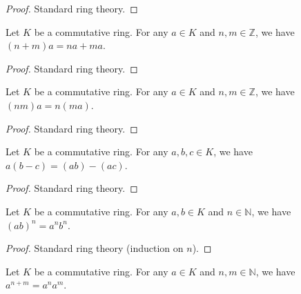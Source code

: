 \begin{proof}
\leanok
Standard ring theory.
\end{proof}

\begin{lemma}
\label{lem.commring.add-zsmul}
\leanhelper
\leanok
Let $K$ be a commutative ring. For any $a\in K$ and $n,m\in\mathbb{Z}$, we have
$\left(  n+m\right)  a=na+ma$.
\end{lemma}

\begin{proof}
\leanok
Standard ring theory.
\end{proof}

\begin{lemma}
\label{lem.commring.mul-zsmul}
\leanhelper
\leanok
Let $K$ be a commutative ring. For any $a\in K$ and $n,m\in\mathbb{Z}$, we have
$\left(  nm\right)  a=n\left(  ma\right)$.
\end{lemma}

\begin{proof}
\leanok
Standard ring theory.
\end{proof}

\begin{lemma}
\label{lem.commring.mul-sub}
\leanhelper
\leanok
Let $K$ be a commutative ring. For any $a,b,c\in K$, we have
$a\left(  b-c\right)  =\left(  ab\right)  -\left(  ac\right)$.
\end{lemma}

\begin{proof}
\leanok
Standard ring theory.
\end{proof}

\begin{lemma}
\label{lem.commring.mul-pow}
\leanhelper
\leanok
Let $K$ be a commutative ring. For any $a,b\in K$ and $n\in\mathbb{N}$, we have
$\left(  ab\right)  ^{n}=a^{n}b^{n}$.
\end{lemma}

\begin{proof}
\leanok
Standard ring theory (induction on $n$).
\end{proof}

\begin{lemma}
\label{lem.commring.pow-add}
\leanhelper
\leanok
Let $K$ be a commutative ring. For any $a\in K$ and $n,m\in\mathbb{N}$, we have
$a^{n+m}=a^{n}a^{m}$.
\end{lemma}

